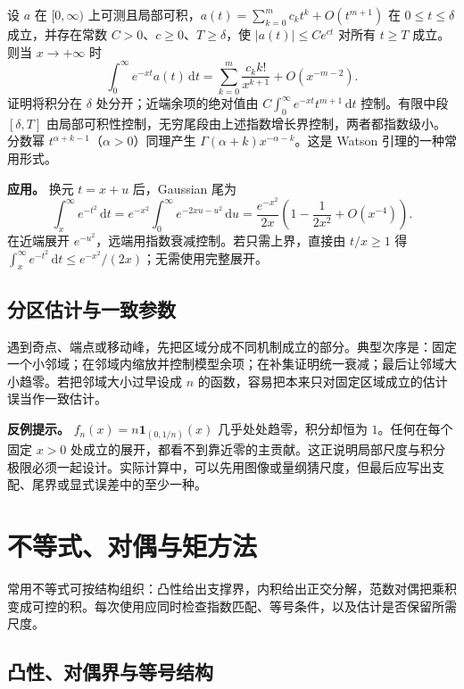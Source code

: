 \documentclass[12pt,fontset=fandol]{ctexart}
\begin{document}
\label{app:estimate-watson}

设 $a$ 在 $[0,\infty)$ 上可测且局部可积，$a(t)=\sum_{k=0}^mc_kt^k+O(t^{m+1})$ 在 $0\leq t\leq\delta$ 成立，并存在常数 $C>0$、$c\geq0$、$T\geq\delta$，使 $|a(t)|\leq Ce^{ct}$ 对所有 $t\geq T$ 成立。则当 $x\to+\infty$ 时
\[
\int_0^\infty e^{-xt}a(t)\,\mathrm dt
=\sum_{k=0}^m\frac{c_kk!}{x^{k+1}}+O(x^{-m-2}).
\]
证明将积分在 $\delta$ 处分开；近端余项的绝对值由 $C\int_0^\infty e^{-xt}t^{m+1}\,\mathrm dt$ 控制。有限中段 $[\delta,T]$ 由局部可积性控制，无穷尾段由上述指数增长界控制，两者都指数级小。分数幂 $t^{\alpha+k-1}$（$\alpha>0$）同理产生 $\Gamma(\alpha+k)x^{-\alpha-k}$。这是 Watson 引理的一种常用形式。

\textbf{应用。} 换元 $t=x+u$ 后，Gaussian 尾为
\[
\int_x^\infty e^{-t^2}\,\mathrm dt
=e^{-x^2}\int_0^\infty e^{-2xu-u^2}\,\mathrm du
=\frac{e^{-x^2}}{2x}\left(1-\frac1{2x^2}+O(x^{-4})\right).
\]
在近端展开 $e^{-u^2}$，远端用指数衰减控制。若只需上界，直接由 $t/x\geq1$ 得 $\int_x^\infty e^{-t^2}\,\mathrm dt\leq e^{-x^2}/(2x)$；无需使用完整展开。

\subsection{分区估计与一致参数}

\label{app:estimate-split}

遇到奇点、端点或移动峰，先把区域分成不同机制成立的部分。典型次序是：固定一个小邻域；在邻域内缩放并控制模型余项；在补集证明统一衰减；最后让邻域大小趋零。若把邻域大小过早设成 $n$ 的函数，容易把本来只对固定区域成立的估计误当作一致估计。

\textbf{反例提示。} $f_n(x)=n\mathbf1_{(0,1/n)}(x)$ 几乎处处趋零，积分却恒为 $1$。任何在每个固定 $x>0$ 处成立的展开，都看不到靠近零的主贡献。这正说明局部尺度与积分极限必须一起设计。实际计算中，可以先用图像或量纲猜尺度，但最后应写出支配、尾界或显式误差中的至少一种。



\section{不等式、对偶与矩方法}

常用不等式可按结构组织：凸性给出支撑界，内积给出正交分解，范数对偶把乘积变成可控的积。每次使用应同时检查指数匹配、等号条件，以及估计是否保留所需尺度。

\subsection{凸性、对偶界与等号结构}
\end{document}
